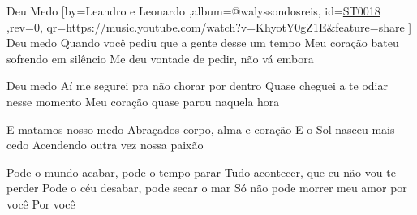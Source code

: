 \beginsong
{Deu Medo %
}[by={Leandro e Leonardo %
},album={@walyssondosreis},
id={\href{https://music.youtube.com/watch?v=KhyotY0gZ1E&feature=share %
}{ST0018 %
}},rev={0}, %
qr={https://music.youtube.com/watch?v=KhyotY0gZ1E&feature=share %
}]
\beginverse
Deu medo
Quando você pediu que a gente desse um tempo
Meu coração bateu sofrendo em silêncio
Me deu vontade de pedir, não vá embora
\endverse

\beginverse
Deu medo
Aí me segurei pra não chorar por dentro
Quase cheguei a te odiar nesse momento
Meu coração quase parou naquela hora
\endverse

\beginverse
E matamos nosso medo
Abraçados corpo, alma e coração
E o Sol nasceu mais cedo
Acendendo outra vez nossa paixão
\endverse

\beginchorus
Pode o mundo acabar, pode o tempo parar
Tudo acontecer, que eu não vou te perder
Pode o céu desabar, pode secar o mar
Só não pode morrer meu amor por você
Por você
\endchorus



